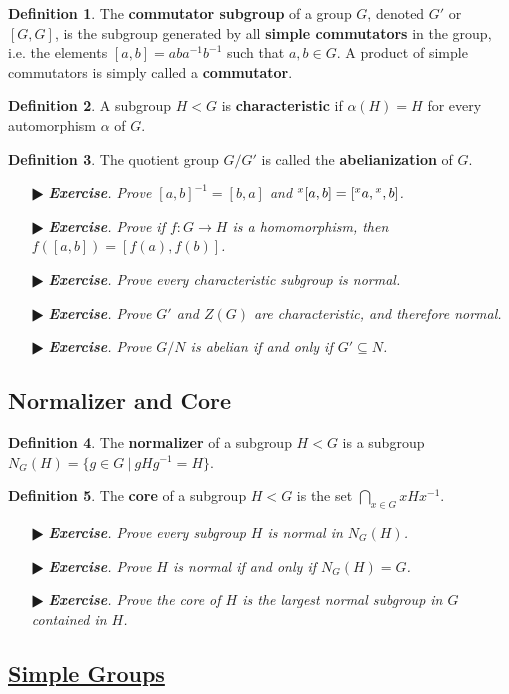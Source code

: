 \documentclass[11pt]{amsart}
\theoremstyle{definition}
\newtheorem*{definition*}{Definition}
\renewcommand\:{\colon}
\newcommand{\1}{\mathds{1}}
\newcommand{\exc}[1]{\vspace{-2.5pt}\begin{itemize}[leftmargin=15pt]\item[$\RHD$] \textit{\textbf{Exercise}. #1}\end{itemize}}
\begin{document}
\begin{definition*}
	The \textbf{commutator subgroup} of a group $G$, denoted $G'$ or $[G, G]$, is the subgroup generated by all \textbf{simple commutators} in the group, i.e. the elements $[a, b] = aba^{-1}b^{-1}$ such that $a, b \in G$. A product of simple commutators is simply called a \textbf{commutator}.
\end{definition*}

\begin{definition*}
	A subgroup $H < G$ is \textbf{characteristic} if $\alpha(H) = H$ for every automorphism $\alpha$ of $G$.
\end{definition*}

\begin{definition*}
	The quotient group $G/G'$ is called the \textbf{abelianization} of $G$.
\end{definition*}

\exc{Prove $[a,b]^{-1} = [b,a]$ and $\null^x[a, b] = [\null^xa, \null^x,b]$.}
\exc{Prove if $f\: G \to H$ is a homomorphism, then $f([a,b]) = [f(a), f(b)]$.}
\exc{Prove every characteristic subgroup is normal.}
\exc{Prove $G'$ and $Z(G)$ are characteristic, and therefore normal.}
\exc{Prove  $G/N$ is abelian if and only if $G' \subseteq N$.}
\vskip20pt 

\subsection*{Normalizer and Core}

\begin{definition*}
	The \textbf{normalizer} of a subgroup $H < G$ is a subgroup $N_G(H) = \{ g \in G \ | \ gHg^{-1} = H\}$.
\end{definition*}

\begin{definition*}
	The \textbf{core} of a subgroup $H < G$ is the set $\bigcap_{x \in G} xHx^{-1}$.
\end{definition*}

\exc{Prove every subgroup $H$ is normal in $N_G(H)$.}
\exc{Prove $H$ is normal if and only if $N_G(H) = G$.}
\exc{Prove the core of $H$ is the largest normal subgroup in $G$ contained in $H$.}

\clearpage



\subsection*{\underline{Simple Groups}}
\end{document}
